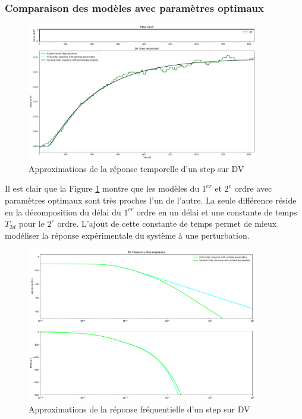 \subsubsection{Comparaison des modèles avec paramètres optimaux}

\begin{figure}[H]
    \centering
    \includegraphics[width=0.9\textwidth]{../Plots/DV_Approximations_comparison_time.png}
    \caption{Approximations de la réponse temporelle d'un step sur DV}
    \label{fig:DV_approximation_comparison_time}
\end{figure}
Il est clair que la Figure \ref{fig:DV_approximation_comparison_time} montre que les modèles du $1^{er}$ et $2^{e}$ ordre avec paramètres optimaux sont très proches l'un de l'autre.
La seule différence réside en la décomposition du délai du $1^{er}$ ordre en un délai et une constante de temps $T_{2d}$ pour le $2^{e}$ ordre.
L'ajout de cette constante de temps permet de mieux modéliser la réponse expérimentale du système à une perturbation.
\begin{figure}[H]
    \centering
    \includegraphics[width=0.9\textwidth]{../Plots/DV_Approximations_comparison_frequency.png}
    \caption{Approximations de la réponse fréquentielle d'un step sur DV}
    \label{fig:DV_approximation_comparison_frequency}
\end{figure}
